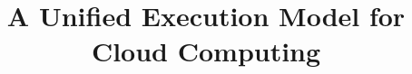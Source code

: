 \documentclass{sig-alternate}
\begin{document}
%

\title{A Unified Execution Model for Cloud Computing}
%
%
%
%
%
\end{document}
